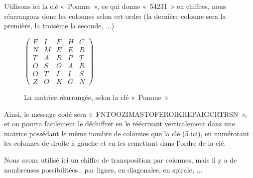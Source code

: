 Utilisons ici la clé «~Pomme~», ce qui donne «~54231~» en chiffres,
nous réarrangons donc les colonnes selon cet ordre (la dernière
colonne sera la première, la troisème la seconde, ...)

\begin{figure}[h]
  \begin{center}
  $
  \left(
    \begin{array}{ccccc}
      F & I & F & H & C \\ 
      N & M & E & E & R \\
      T & A & R & P & T \\
      O & S & O & A & R \\
      O & T & I & I & S \\
      Z & O & K & G & N
    \end{array}
  \right)
  $
  \end{center}
  \caption{La matrice réarrangée, selon la clé «~Pomme~»}
  \label{fig:TranspositionMatriceCode}
\end{figure}

Ainsi, le message codé sera «~FNTOOZIMASTOFEROIKHEPAIGCRTRSN~», et on
pourra facilement le déchiffrer en le réécrivant verticalement dans
une matrice possédant le même nombre de colonnes que la clé (5 ici),
en numérotant les colonnes de droite à gauche et en les remettant dans
l'ordre de la clé.

Nous avons utilisé ici un chiffre de transposition par colonnes, mais
il y a de nombreuses possibilitées : par lignes, en diagonales, en
spirale, ...

